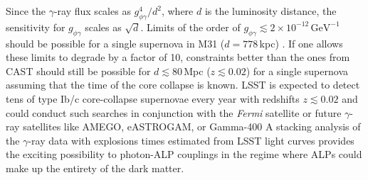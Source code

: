 Since the $\gamma$-ray flux scales as $g_{\phi\gamma}^4 / d^2$, where $d$ is the luminosity distance, the sensitivity for $g_{\phi\gamma}$ scales as $\sqrt{d}$. 
Limits of the order of $g_{\phi\gamma} \lesssim 2\times10^{-12}\,\mathrm{GeV}^{-1}$ should be possible for a single supernova in M31 ($d=778$\,kpc) \citep{2017PhRvL.118a1103M}. 
If one allows these limits to degrade by a factor of 10, constraints better than the ones from CAST should still be possible for $d\lesssim 80\,$Mpc ($z \lesssim 0.02$) for a single supernova assuming that the time of the core collapse is known. 
LSST is expected to detect tens of type Ib/c core-collapse supernovae every year with redshifts $z \lesssim 0.02$ \citep{Goldstein:2018} and could conduct such searches in conjunction with the \textit{Fermi} satellite or future $\gamma$-ray satellites like AMEGO, eASTROGAM, or Gamma-400 \citep[\eg,][]{2017ICRC...35..910C,1502.02976} 
A stacking analysis of the $\gamma$-ray data with explosions times estimated from LSST light curves provides the exciting possibility to photon-ALP couplings in the regime where ALPs could make up the entirety of the dark matter. 




